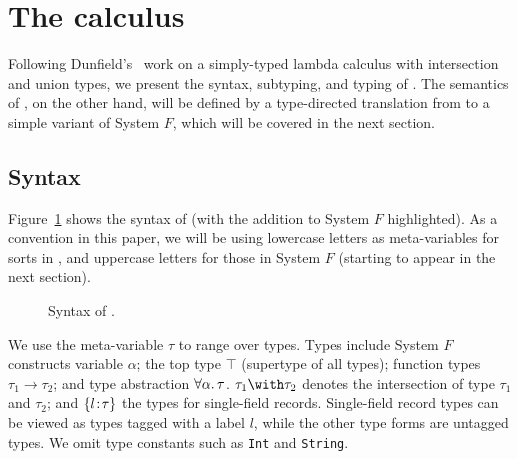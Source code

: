 \section{The \name calculus} \label{sec:fi}

Following Dunfield's~\cite{dunfield2014elaborating} work on a simply-typed
lambda calculus with intersection and union types, we present the syntax,
subtyping, and typing of \name. The semantics of \name, on the other hand, will
be defined by a type-directed translation from \name to a simple variant of
System $F$, which will be covered in the next section.

\subsection{Syntax}

Figure~\ref{fig:fi-syntax} shows the syntax of \name (with the addition to
System $F$ highlighted). As a convention in this paper, we will be using
lowercase letters as meta-variables for sorts in \name, and uppercase letters
for those in System $F$ (starting to appear in the next section).


\begin{figure}[h]
  
  \caption{Syntax of \name.}
  \label{fig:fi-syntax}
\end{figure}

We use the meta-variable $\tau$ to range over types. Types include System $F$
constructs variable $ \alpha $; the top type $\top$ (supertype of all types);
function types $ \tau_1 \to \tau_2 $; and type abstraction $ \forall \alpha. \, \tau $.
$ \tau_1 \andop \tau_2 $ denotes the intersection of type $ \tau_1 $ and
$ \tau_2 $; and $ \{ l \!:\! \tau \} $ the types for single-field records.
Single-field record types can be viewed as types tagged with a label $l$, while
the other type forms are untagged types. We omit type constants such as
\lstinline$Int$ and \lstinline$String$.

